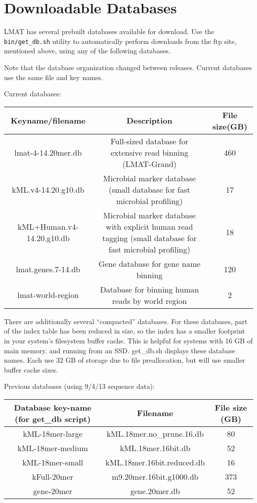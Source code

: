 \documentclass[11pt]{article}
\begin{document}
\section{Downloadable Databases}
\label{sec:downloads}


LMAT has several prebuilt databases available for download.  Use the \texttt{bin/get\_db.sh} utility to automatically perform downloads from the ftp site, mentioned above, using any of the following databases.  

Note that the database organization changed between releases.  Current databases use the same file and key names.  

Current databases:


\begin{tabular}{| c | c | c |}
\hline
Keyname/filename & Description & File size(GB) \\
\hline
lmat-4-14.20mer.db & Full-sized database for extensive read binning (LMAT-Grand) & 460 \\
\hline
kML.v4-14.20.g10.db & Microbial marker database (small database for fast microbial profiling) & 17 \\
\hline
kML+Human.v4-14.20.g10.db & Microbial marker database with explicit human read tagging (small database for fast microbial profiling) & 18 \\
\hline
lmat.genes.7-14.db & Gene database for gene name binning & 120 \\
\hline
lmat-world-region & Database for binning human reads by world region & 2 \\
\hline
\end{tabular}


There are additionally several ``compacted'' databases.  For these databases, part of the index table has been reduced in size, so the index has a smaller footprint in your system's filesystem buffer cache.  This is helpful for systems with 16 GB of main memory. and running from an SSD.  get\_db.sh displays these database names.  Each use 32 GB of storage due to file preallocation, but will use smaller buffer cache sizes.


Previous databases (using 9/4/13 sequence data):

\begin{tabular}{| c | c | c |}
\hline
Database key-name (for get\_db script) & Filename & File size (GB) \\
\hline
kML-18mer-large & kML.18mer.no\_prune.16.db & 80 \\
\hline
kML-18mer-medium & kML.18mer.16bit.db  & 52 \\
\hline
kML-18mer-small & kML.18mer.16bit.reduced.db  & 16 \\
\hline
kFull-20mer & m9.20mer.16bit.g1000.db & 373 \\
\hline
gene-20mer & gene.20mer.db & 52 \\
\hline
\end{tabular}
\end{document}
